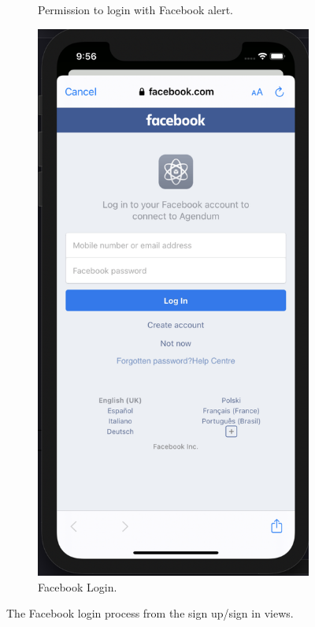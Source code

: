 \begin{figure}[H]
\begin{subfigure}[b]{0.3\textwidth}
        \caption{Permission to login with Facebook alert.}
        \label{fig:facebook1_app}
    \end{subfigure}
    \hfill
    \begin{subfigure}[b]{0.3\textwidth}
        \centering
        \includegraphics[width=\textwidth]{./graphics/Implementation/Splash_Sign_Up_Sign_In/facebook2.png}
        \caption{Facebook Login.}
        \label{fig:facebook2_app}
    \end{subfigure}
    
    \caption{The Facebook login process from the sign up/sign in views.}
    \label{fig:facebook_login_app}
\end{figure}
